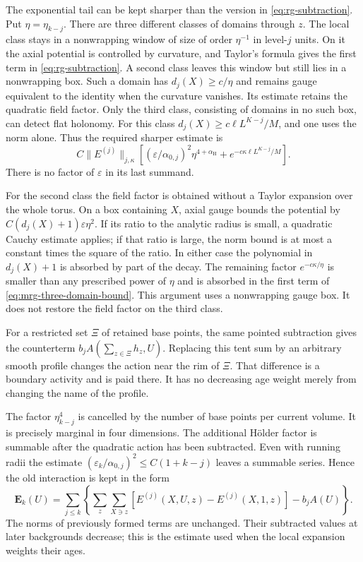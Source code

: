 \documentclass[11pt,letterpaper,reqno]{amsart}
\theoremstyle{definition}
\theoremstyle{remark}
\begin{document}
The exponential tail can be kept sharper than the version in
\eqref{eq:rg-subtraction}. Put $\eta=\eta_{k-j}$.
There are three different classes of domains through $z$.
The local class stays in a nonwrapping window of size of order
$\eta^{-1}$ in level-$j$ units. On it the axial potential is
controlled by curvature, and Taylor's formula gives the first
term in \eqref{eq:rg-subtraction}. A second class leaves this
window but still lies in a nonwrapping box. Such a domain has
$d_j(X)\ge c/\eta$ and remains gauge equivalent to the
identity when the curvature vanishes. Its estimate retains the
quadratic field factor. Only the third class, consisting of
domains in no such box, can detect flat holonomy. For this class
$d_j(X)\ge c\ell L^{K-j}/M$, and one uses the norm alone.
Thus the required sharper estimate is
\begin{equation}\label{eq:mrg-three-domain-bound}
 C\|E^{(j)}\|_{j,\kappa}
   \left[(\varepsilon/\alpha_{0,j})^2
                    \eta^{4+\alpha_{\mathrm H}}
          +e^{-c\kappa\ell L^{K-j}/M}\right].
\end{equation}
There is no factor of $\varepsilon$ in its last summand.

For the second class the field factor is obtained without a
Taylor expansion over the whole torus. On a box containing
$X$, axial gauge bounds the potential by
$C(d_j(X)+1)\varepsilon\eta^2$.
If its ratio to the analytic radius is small, a quadratic
Cauchy estimate applies; if that ratio is large, the norm
bound is at most a constant times the square of the ratio.
In either case the polynomial in $d_j(X)+1$ is absorbed by
part of the decay. The remaining factor
$e^{-c\kappa/\eta}$ is smaller than any prescribed power
of $\eta$ and is absorbed in the first term of
\eqref{eq:mrg-three-domain-bound}. This argument uses a
nonwrapping gauge box. It does not restore the field factor
on the third class.

For a restricted set $\Xi$ of retained base points, the same
pointed subtraction gives the counterterm
$b_jA(\sum_{z\in\Xi}h_z,U)$. Replacing this tent sum by an
arbitrary smooth profile changes the action near the rim of
$\Xi$. That difference is a boundary activity and is paid
there. It has no decreasing age weight merely from changing
the name of the profile.

The factor $\eta_{k-j}^4$ is cancelled by the number of base points
per current volume. It is precisely marginal in four dimensions.
The additional H\"older factor is summable after the quadratic
action has been subtracted. Even with running radii the estimate
$(\varepsilon_k/\alpha_{0,j})^2\le C(1+k-j)$ leaves a summable
series. Hence the old interaction is kept in the form
\begin{equation}\label{eq:rg-old-interaction}
 \mathbf E_k(U)=\sum_{j\le k}
 \left\{\sum_z\sum_{X\ni z}
 [E^{(j)}(X,U,z)-E^{(j)}(X,1,z)]-b_jA(U)\right\}.
\end{equation}
The norms of previously formed terms are unchanged. Their
subtracted values at later backgrounds decrease; this is the
estimate used when the local expansion weights their ages.
\end{document}
